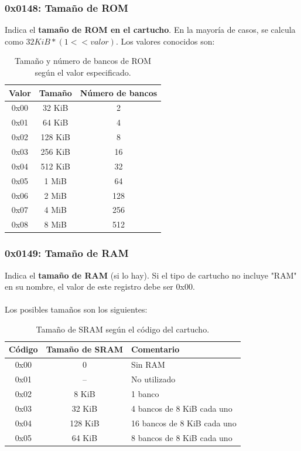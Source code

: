 \subsubsection{0x0148: Tamaño de ROM}
Indica el \textbf{tamaño de ROM en el cartucho}. En la mayoría de casos, se calcula como $32 KiB * (1 << valor)$. Los valores conocidos son:

\begin{table}[h]
    \centering
    \begin{tabular}{|c|c|c|}
        \hline
        \textbf{Valor} & \textbf{Tamaño} & \textbf{Número de bancos} \\
        \hline
        0x00 & 32 KiB & 2 \\ \hline
        0x01 & 64 KiB & 4 \\ \hline
        0x02 & 128 KiB & 8 \\ \hline
        0x03 & 256 KiB & 16 \\ \hline
        0x04 & 512 KiB & 32 \\ \hline
        0x05 & 1 MiB & 64 \\ \hline
        0x06 & 2 MiB & 128 \\ \hline
        0x07 & 4 MiB & 256 \\ \hline
        0x08 & 8 MiB & 512 \\ \hline
    \end{tabular}
    \caption{Tamaño y número de bancos de ROM según el valor especificado.}
    \label{tab:rom_size_banks}
\end{table}

\subsubsection{0x0149: Tamaño de RAM}
Indica el \textbf{tamaño de RAM} (si lo hay). Si el tipo de cartucho no incluye "RAM" en su nombre, el valor de este registro debe ser 0x00. 
\\\\
Los posibles tamaños son los siguientes:

\begin{table}[H]
    \centering
    \begin{tabular}{|c|c|l|}
        \hline
        \textbf{Código} & \textbf{Tamaño de SRAM} & \textbf{Comentario} \\ \hline
        0x00 & 0 & Sin RAM \\ \hline
        0x01 & – & No utilizado \\ \hline
        0x02 & 8 KiB & 1 banco \\ \hline
        0x03 & 32 KiB & 4 bancos de 8 KiB cada uno \\ \hline
        0x04 & 128 KiB & 16 bancos de 8 KiB cada uno \\ \hline
        0x05 & 64 KiB & 8 bancos de 8 KiB cada uno \\ \hline
    \end{tabular}
    \caption{Tamaño de SRAM según el código del cartucho.}
    \label{tab:sram_size}
\end{table}

